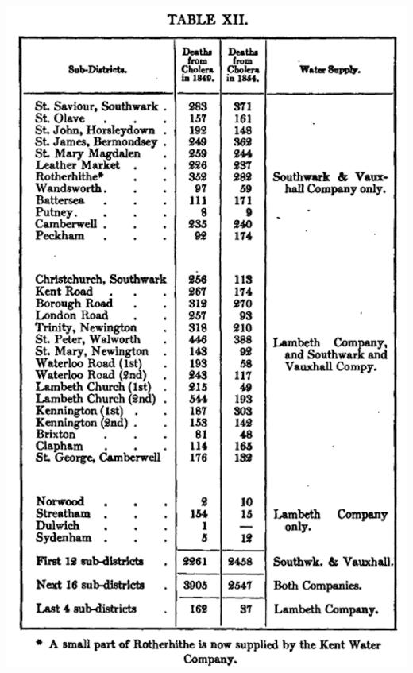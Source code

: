 \documentclass[aspectratio=43]{beamer}
\begin{document}
\begin{frame}
\begin{minipage}{0.49\textwidth}
\includegraphics[width = \textwidth]{../img/snow_table12}
\end{minipage}

\end{frame}
\end{document}
